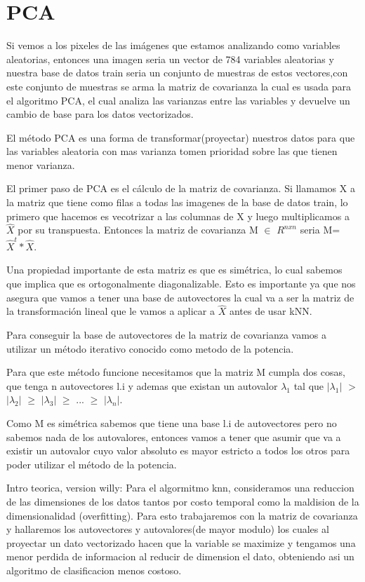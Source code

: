 \section{PCA}
Si vemos a los pixeles de las imágenes que estamos analizando como variables aleatorias, entonces una imagen seria un vector de 784 variables aleatorias y nuestra base de datos train seria un conjunto de muestras de estos vectores,con este conjunto de muestras se arma la matriz de covarianza la cual es usada para el algoritmo PCA, el cual analiza las varianzas entre las variables y devuelve un cambio de base para los datos vectorizados. \par
\indent El método PCA es una forma de transformar(proyectar) nuestros datos para que las variables aleatoria con mas varianza tomen prioridad sobre las que tienen menor varianza.\par
\indent El primer paso de PCA es el cálculo de la matriz de covarianza. Si llamamos X a la matriz que tiene como filas a todas las imagenes de la base de datos train, lo primero que hacemos es vecotrizar a las columnas de X y luego multiplicamos a $\hat{X}$ por su transpuesta. Entonces la matriz de covarianza M $\in$ $R^{nxn}$  seria M=$\hat{X}^{t}*\hat{X}$. \par
\indent Una propiedad importante de esta matriz es que es simétrica, lo cual sabemos que implica que es ortogonalmente diagonalizable. Esto es importante ya que nos asegura que vamos a tener una base de autovectores la cual va a ser la matriz de la transformación lineal que le vamos a aplicar a $\hat{X}$ antes de usar kNN. \par
\indent Para conseguir la base de autovectores de la matriz de covarianza vamos a utilizar un método iterativo conocido como metodo de la potencia. \par
\indent Para que este método funcione necesitamos que la matriz M cumpla dos cosas, que tenga n autovectores l.i y ademas que existan un autovalor $\lambda_1$ tal que $|\lambda_1|$ $>$ $|\lambda_2|$ $\geq$ $|\lambda_3|$ $\geq$ ... $\geq$ $|\lambda_n|$. \par
\indent Como M es simétrica sabemos que tiene una base l.i de autovectores pero no sabemos nada de los autovalores, entonces vamos a tener que asumir que va a existir un autovalor cuyo valor absoluto es mayor estricto a todos los otros para poder utilizar el método de la potencia.\par
\break
Intro teorica, version willy:
Para el algormitmo knn, consideramos una reduccion de las dimensiones de los datos tantos por costo temporal como la maldision de la dimensionalidad (overfitting). Para esto trabajaremos con la matriz de covarianza y hallaremos los autovectores y autovalores(de mayor modulo) los cuales al proyectar un dato vectorizado hacen que la variable se maximize y tengamos una menor perdida de informacion al reducir de dimension el dato, obteniendo asi un algoritmo de clasificacion menos costoso.
